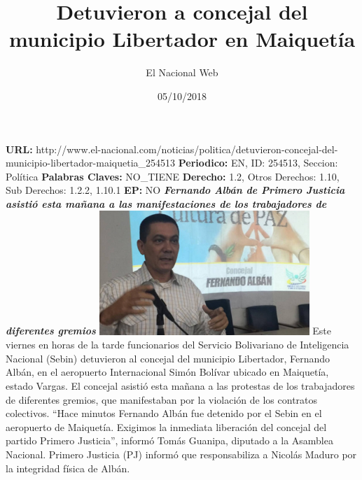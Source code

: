 \documentclass{article}%
\title{\textbf{Detuvieron a concejal del municipio Libertador en Maiquetía}}%
\author{El Nacional Web}%
\date{05/10/2018}%
\begin{document}
%
\normalsize%
\maketitle%
\textbf{URL: }%
http://www.el{-}nacional.com/noticias/politica/detuvieron{-}concejal{-}del{-}municipio{-}libertador{-}maiquetia\_254513\newline%
%
\textbf{Periodico: }%
EN, %
ID: %
254513, %
Seccion: %
Política\newline%
%
\textbf{Palabras Claves: }%
NO\_TIENE\newline%
%
\textbf{Derecho: }%
1.2, %
Otros Derechos: %
1.10, %
Sub Derechos: %
1.2.2, 1.10.1\newline%
%
\textbf{EP: }%
NO\newline%
\newline%
%
\textbf{\textit{Fernando Albán de Primero Justicia asistió esta mañana a las manifestaciones de los trabajadores de diferentes gremios}}%
\newline%
\newline%
%
\includegraphics[width=300px]{152.jpg}%
\newline%
%
Este viernes en horas de la tarde funcionarios del Servicio Bolivariano de Inteligencia Nacional (Sebin) detuvieron al concejal del municipio Libertador, Fernando Albán, en el aeropuerto Internacional Simón Bolívar ubicado en Maiquetía, estado Vargas.%
\newline%
%
El concejal asistió esta mañana a las protestas de los trabajadores de diferentes gremios, que manifestaban por la violación de los contratos colectivos.%
\newline%
%
“Hace minutos Fernando Albán fue detenido por el Sebin en el aeropuerto de Maiquetía. Exigimos la inmediata liberación del concejal del partido Primero Justicia”, informó Tomás Guanipa, diputado a la Asamblea Nacional.%
\newline%
%
Primero Justicia (PJ) informó que responsabiliza a Nicolás Maduro por la integridad física de Albán.%
\newline%
%
\end{document}
